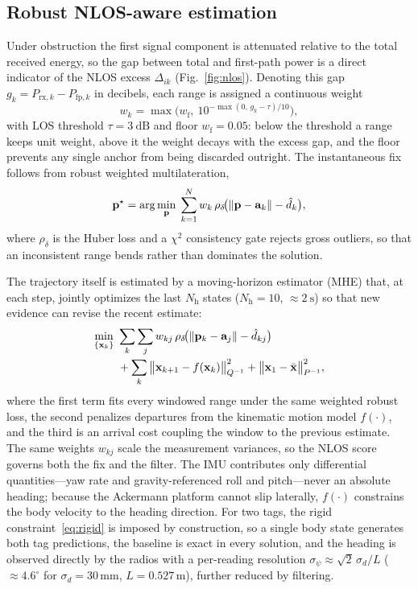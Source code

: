\subsection{Robust NLOS-aware estimation}
Under obstruction the first signal component is attenuated relative to
the total received energy, so the gap between total and first-path power
is a direct indicator of the NLOS excess $\Delta_{ik}$
(Fig.~\ref{fig:nlos}). Denoting this gap $g_k = P_{\mathrm{rx},k} -
P_{\mathrm{fp},k}$ in decibels, each range is assigned a continuous
weight
\begin{equation}
  w_k = \max\!\Big(w_{\mathrm{f}},\ 10^{-\max(0,\,g_k-\tau)/10}\Big),
  \label{eq:nlos}
\end{equation}
with LOS threshold $\tau=\SI{3}{\dB}$ and floor $w_{\mathrm{f}}=0.05$:
below the threshold a range keeps unit weight, above it the weight decays
with the excess gap, and the floor prevents any single anchor from being
discarded outright. The instantaneous fix follows from robust weighted
multilateration,
\begin{equation}
  \mathbf{p}^\star = \arg\min_{\mathbf{p}}\;
  \sum_{k=1}^{N} w_k\,\rho_\delta\!\big(\lVert \mathbf{p}-\mathbf{a}_k\rVert - \hat{d}_k\big),
  \label{eq:ls}
\end{equation}
where $\rho_\delta$ is the Huber loss and a $\chi^2$ consistency gate
rejects gross outliers, so that an inconsistent range bends rather than
dominates the solution.

The trajectory itself is estimated by a moving-horizon estimator (MHE)
that, at each step, jointly optimizes the last $N_{\mathrm{h}}$ states
($N_{\mathrm{h}}{=}10$, $\approx\!\SI{2}{\second}$) so that new evidence
can revise the recent estimate:
\begin{equation}
\begin{aligned}
  \min_{\{\mathbf{x}_k\}}\ &
  \sum_{k}\sum_{j} w_{kj}\,\rho_\delta\!\big(\lVert\mathbf{p}_k-\mathbf{a}_j\rVert - \hat{d}_{kj}\big)\\[-1pt]
  &{}+ \sum_{k}\big\lVert \mathbf{x}_{k+1}-f(\mathbf{x}_k)\big\rVert^2_{Q^{-1}}
  + \big\lVert \mathbf{x}_1-\bar{\mathbf{x}}\big\rVert^2_{P^{-1}},
\end{aligned}
\label{eq:mhe}
\end{equation}
where the first term fits every windowed range under the same weighted
robust loss, the second penalizes departures from the kinematic motion
model $f(\cdot)$, and the third is an arrival cost coupling the window to
the previous estimate. The same weights $w_{kj}$ scale the measurement
variances, so the NLOS score governs both the fix and the filter. The
IMU contributes only differential quantities---yaw rate and
gravity-referenced roll and pitch---never an absolute heading; because
the Ackermann platform cannot slip laterally, $f(\cdot)$ constrains the
body velocity to the heading direction. For two tags, the rigid
constraint~\eqref{eq:rigid} is imposed by construction, so a single body
state generates both tag predictions, the baseline is exact in every
solution, and the heading is observed directly by the radios with a
per-reading resolution $\sigma_\psi \approx \sqrt{2}\,\sigma_d/L$
($\approx\!4.6^\circ$ for $\sigma_d\!=\!30$\,mm, $L\!=\!0.527$\,m),
further reduced by filtering.

